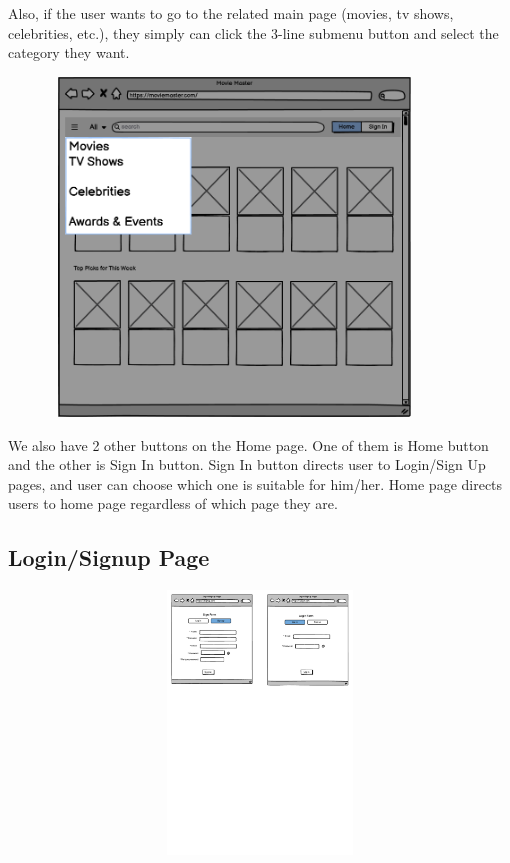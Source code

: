 \newpage
Also, if the user wants to go to the related main page (movies, tv shows, celebrities, etc.), they simply can click the 3-line submenu button and select the category they want. 

\begin{center}
    \includegraphics[width=12cm, height=9cm]{pictures/Main Menu.png}
\end{center}

We also have 2 other buttons on the Home page. One of them is Home button and the other is Sign In button. Sign In button directs user to Login/Sign Up pages, and user can choose which one is suitable for him/her. Home page directs users to home page regardless of which page they are. 

\subsection{Login/Signup Page}

\begin{center}
\includegraphics[width=17cm, height=7cm]{pictures/Login Signup Form.pdf}
\end{center}

